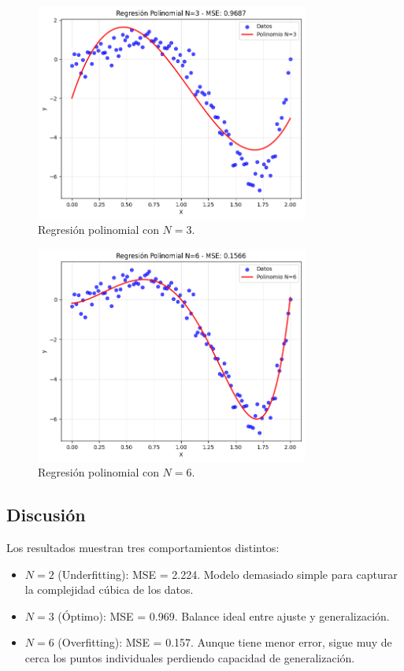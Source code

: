 \documentclass{article}
\begin{document}
\begin{figure}[H]
    \centering
    \includegraphics[width=0.8\textwidth]{images/8_N3.png}
    \caption{Regresión polinomial con $N=3$.}
\end{figure}

\begin{figure}[H]
    \centering
    \includegraphics[width=0.8\textwidth]{images/8_N6.png}
    \caption{Regresión polinomial con $N=6$.}
\end{figure}

\subsection{Discusión}

Los resultados muestran tres comportamientos distintos:

\begin{itemize}
    \item $N=2$ (Underfitting): MSE = 2.224. Modelo demasiado simple para capturar la complejidad cúbica de los datos.
    \item $N=3$ (Óptimo): MSE = 0.969. Balance ideal entre ajuste y generalización.
    \item $N=6$ (Overfitting): MSE = 0.157. Aunque tiene menor error, sigue muy de cerca los puntos individuales perdiendo capacidad de generalización.
\end{itemize}
\end{document}
